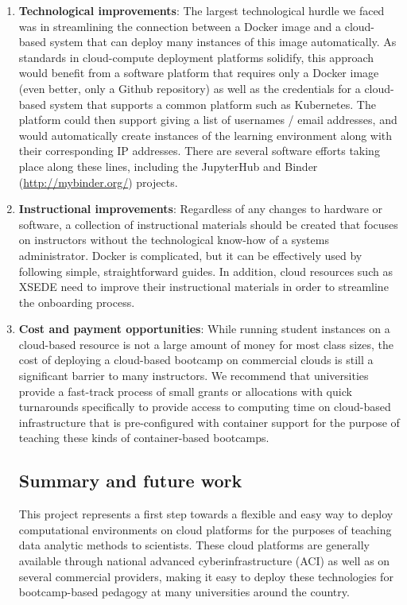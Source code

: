 \begin{enumerate}

\item {\bf Technological improvements}: The largest technological hurdle we
faced was in streamlining the connection between a Docker image and a
cloud-based system that can deploy many instances of this image automatically.
As standards in cloud-compute deployment platforms solidify, this approach would
benefit from a software platform that requires only a Docker image (even better,
only a Github repository) as well as the credentials for a cloud-based system
that supports a common platform such as Kubernetes. The platform could then
support giving a list of usernames / email addresses, and would automatically
create instances of the learning environment along with their corresponding IP
addresses. There are several software efforts taking place along these
lines, including the JupyterHub \cite{perez2015project} and Binder (\url{http://mybinder.org/}) projects.

\item {\bf Instructional improvements}: Regardless of any changes to hardware
or software, a collection of instructional materials should be created that
focuses on instructors without the technological know-how of a systems administrator.
Docker is complicated, but it can be effectively used by following simple,
straightforward guides. In addition, cloud resources such as XSEDE need to
improve their instructional materials in order to
streamline the onboarding process.

\item {\bf Cost and payment opportunities}: While running student instances on a
cloud-based resource is not a large amount of money for most class sizes, the
cost of deploying a cloud-based bootcamp on commercial clouds is still a
significant barrier to many instructors. We recommend that universities provide
a fast-track process of small grants or allocations with quick turnarounds
specifically to provide access to computing time on cloud-based infrastructure
that is pre-configured with container support for the purpose of teaching
these kinds of container-based bootcamps.

\subsection{Summary and future work}

This project represents a first step towards a flexible and easy way to deploy
computational environments on cloud platforms for the purposes of teaching
data analytic methods to scientists. These cloud platforms are generally available
through national advanced cyberinfrastructure (ACI) as well as on several
commercial providers, making it easy to deploy these technologies for
bootcamp-based pedagogy at many universities around the country.


\end{enumerate}
